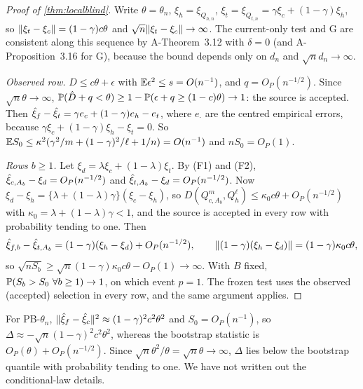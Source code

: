 \documentclass[11pt,a4paper]{article}
\begin{document}
\begin{proof}[Proof of \cref{thm:localblind}]
Write $\theta=\theta_n$, $\xi_h=\xi_{Q_{h,n}}$, $\xi_t=\xi_{Q_{t,n}}=\gamma\xi_c+(1-\gamma)\xi_h$, so $\norm{\xi_t-\xi_c}=(1-\gamma)c\theta$ and $\sqrt n\norm{\xi_t-\xi_c}\to\infty$. The current-only test and G are consistent along this sequence by A-Theorem~3.12 with $\delta=0$ (and A-Proposition~3.16 for G), because the bound depends only on $d_n$ and $\sqrt nd_n\to\infty$.

\emph{Observed row.} $\hat D\le c\theta+\epsilon$ with $\E\epsilon^2\le s=O(n^{-1})$, and $q=O_P(n^{-1/2})$. Since $\sqrt n\theta\to\infty$, $\P(\hat D+q<\theta)\ge1-\P(\epsilon+q\ge(1-c)\theta)\to1$: the source is accepted. Then $\hxi_f-\hxi_t=\gamma e_c+(1-\gamma)e_h-e_t$, where $e_\cdot$ are the centred empirical errors, because $\gamma\xi_c+(1-\gamma)\xi_h-\xi_t=0$. So $\E S_0\le\kappa^2(\gamma^2/m+(1-\gamma)^2/\ell+1/n)=O(n^{-1})$ and $nS_0=O_P(1)$.

\emph{Rows $b\ge1$.} Let $\xi_d=\lambda\xi_c+(1-\lambda)\xi_t$. By (F1) and (F2), $\hxi_{c,A_b}-\xi_d=O_P(n^{-1/2})$ and $\hxi_{t,A_b}-\xi_d=O_P(n^{-1/2})$. Now $\xi_d-\xi_h=\{\lambda+(1-\lambda)\gamma\}(\xi_c-\xi_h)$, so $D(Q^m_{c,A_b},Q^\ell_h)\le\kappa_0c\theta+O_P(n^{-1/2})$ with $\kappa_0=\lambda+(1-\lambda)\gamma<1$, and the source is accepted in every row with probability tending to one. Then
\[
\hxi_{f,b}-\hxi_{t,A_b}=(1-\gamma)(\xi_h-\xi_d)+O_P(n^{-1/2}),\qquad\norm{(1-\gamma)(\xi_h-\xi_d)}=(1-\gamma)\kappa_0c\theta,
\]
so $\sqrt{nS_b}\ge\sqrt n(1-\gamma)\kappa_0c\theta-O_P(1)\to\infty$. With $B$ fixed, $\P(S_b>S_0\ \forall b\ge1)\to1$, on which event $p=1$. The frozen test uses the observed (accepted) selection in every row, and the same argument applies.
\end{proof}

\begin{remark}
For PB-$\theta_n$, $\norm{\hxi_f-\hxi_c}^2\approx(1-\gamma)^2c^2\theta^2$ and $S_0=O_P(n^{-1})$, so $\Delta\approx-\sqrt n(1-\gamma)^2c^2\theta^2$, whereas the bootstrap statistic is $O_P(\theta)+O_P(n^{-1/2})$. Since $\sqrt n\theta^2/\theta=\sqrt n\theta\to\infty$, $\Delta$ lies below the bootstrap quantile with probability tending to one. We have not written out the conditional-law details.
\end{remark}
\end{document}
